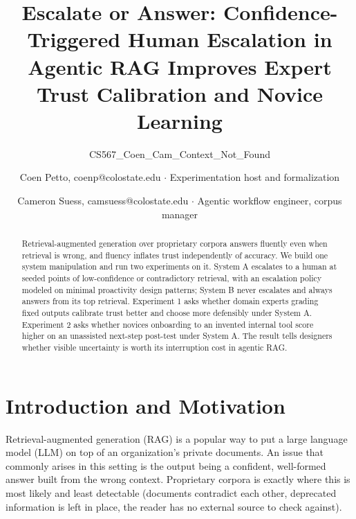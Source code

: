 \documentclass[sigconf,nonacm]{acmart}
\begin{document}
\title{Escalate or Answer: Confidence-Triggered Human Escalation in Agentic RAG Improves Expert Trust Calibration and Novice Learning}
\subtitle{CS567\_Coen\_Cam\_Context\_Not\_Found}

\author{Coen Petto, coenp@colostate.edu $\cdot$ Experimentation host and formalization}
\author{Cameron Suess, camsuess@colostate.edu $\cdot$ Agentic workflow engineer, corpus manager}

\begin{abstract}
Retrieval-augmented generation over proprietary corpora answers fluently
even when retrieval is wrong, and fluency inflates trust independently of
accuracy. We build one system manipulation and run two experiments on it.
System A escalates to a human at seeded points of low-confidence or
contradictory retrieval, with an escalation policy modeled on minimal
proactivity design patterns; System B never escalates and always answers
from its top retrieval. Experiment 1 asks whether domain experts grading
fixed outputs calibrate trust better and choose more defensibly under
System A. Experiment 2 asks whether novices onboarding to an invented
internal tool score higher on an unassisted next-step post-test under
System A. The result tells designers whether visible uncertainty is worth
its interruption cost in agentic RAG.
\end{abstract}


\maketitle
\renewcommand{\shortauthors}{Petto and Suess}

\section{Introduction and Motivation}
\label{sec:intro}

Retrieval-augmented generation (RAG) is a popular way to put a large
language model (LLM) on top of an organization's private documents. An issue that commonly arises in this setting is the output being a
confident, well-formed answer built from the wrong context. Proprietary
corpora is exactly where this is most likely and least detectable (documents contradict each other, deprecated information is left in place, the reader has no external source to check against).
\end{document}
